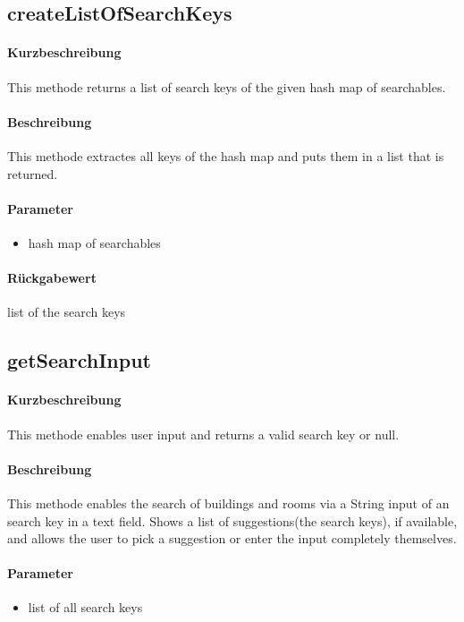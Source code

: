 \subsection{createListOfSearchKeys}%
\paragraph*{Kurzbeschreibung}
This methode returns a list of search keys of the given hash map of searchables.
\paragraph*{Beschreibung}
This methode extractes all keys of the hash map and puts them in a list that is returned.
\paragraph*{Parameter}
\begin{itemize}
    \item hash map of searchables
\end{itemize}
\paragraph*{Rückgabewert}
list of the search keys

\subsection{getSearchInput}%
\paragraph*{Kurzbeschreibung}
This methode enables user input and returns a valid search key or null.
\paragraph*{Beschreibung}
This methode enables the search of buildings and rooms via a String input of an search key in a text field.
Shows a list of suggestions(the search keys), if available, and allows the user to pick a suggestion or enter the input completely themselves.
\paragraph*{Parameter}
\begin{itemize}
    \item list of all search keys
\end{itemize}
